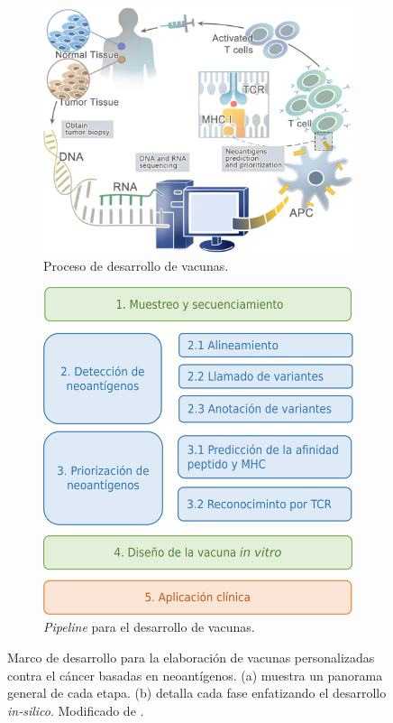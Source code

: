 \documentclass[a4paper]{article}
\begin{document}
\begin{figure}[h]
	\centering
	\begin{subfigure}[b]{0.52\textwidth}
		\centering
		\includegraphics[width=\textwidth]{../img/vaccines/vaccine_pipeline}
		\caption{Proceso de desarrollo de vacunas.}
		\label{fig:vaccines_a}
	\end{subfigure}
	\hfill
	\begin{subfigure}[b]{0.44\textwidth}
		\centering
		\includegraphics[width=\textwidth]{../img/vaccines/pipeline}
		\caption{\textit{Pipeline} para el desarrollo de vacunas.}
		\label{fig:vaccines_b}
	\end{subfigure}
	
	\caption{Marco de desarrollo para la elaboración de vacunas personalizadas contra el cáncer basadas en neoantígenos. (a) muestra un panorama general de cada etapa. (b) detalla cada fase enfatizando el desarrollo \textit{in-silico}.  Modificado de \cite{han2020progress}.}
	\label{fig:vaccines}
\end{figure}
	
\end{document}
